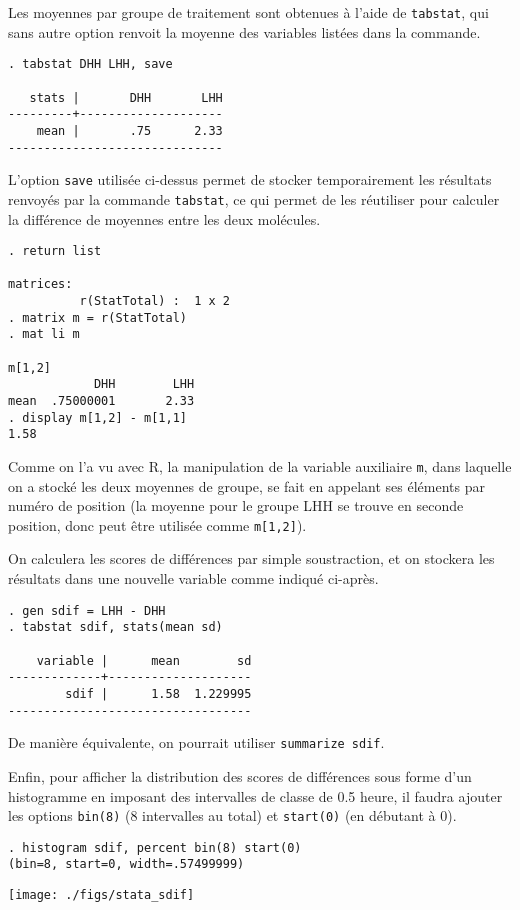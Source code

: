 Les moyennes par groupe de traitement sont obtenues à l'aide de
\texttt{tabstat}, qui sans autre option renvoit la moyenne des variables
listées dans la commande.
\begin{verbatim}
. tabstat DHH LHH, save

   stats |       DHH       LHH
---------+--------------------
    mean |       .75      2.33
------------------------------
\end{verbatim}
L'option \texttt{save} utilisée ci-dessus permet de stocker temporairement
les résultats renvoyés par la commande \texttt{tabstat}, ce qui permet de
les réutiliser pour calculer la différence de moyennes entre les deux
molécules. 
\begin{verbatim}
. return list

matrices:
          r(StatTotal) :  1 x 2
. matrix m = r(StatTotal)
. mat li m

m[1,2]
            DHH        LHH
mean  .75000001       2.33
. display m[1,2] - m[1,1]
1.58
\end{verbatim}
Comme on l'a vu avec R, la manipulation de la variable auxiliaire
\texttt{m}, dans laquelle on a stocké les deux moyennes de groupe, se fait
en appelant ses éléments par numéro de position (la moyenne pour le groupe
LHH se trouve en seconde position, donc peut être utilisée comme
\verb|m[1,2]|). 

On calculera les scores de différences par simple soustraction, et on
stockera les résultats dans une nouvelle variable comme indiqué ci-après.
\begin{verbatim}
. gen sdif = LHH - DHH
. tabstat sdif, stats(mean sd)

    variable |      mean        sd
-------------+--------------------
        sdif |      1.58  1.229995
----------------------------------
\end{verbatim}
De manière équivalente, on pourrait utiliser \verb|summarize sdif|.

Enfin, pour afficher la distribution des scores de différences sous forme
d'un histogramme en imposant des intervalles de classe de 0.5 heure, il
faudra ajouter les options \texttt{bin(8)} (8 intervalles au total) et
\texttt{start(0)} (en débutant à 0).
\begin{verbatim}
. histogram sdif, percent bin(8) start(0)
(bin=8, start=0, width=.57499999)
\end{verbatim}

\texttt{[image: ./figs/stata\_sdif]}

